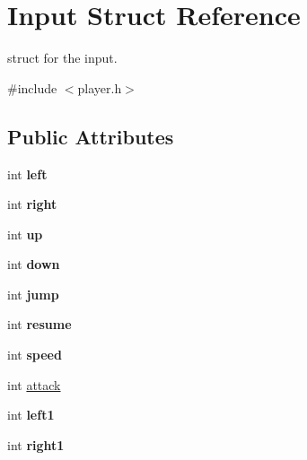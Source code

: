 \hypertarget{structInput}{}\section{Input Struct Reference}
\label{structInput}


struct for the input.  




{\ttfamily \#include $<$player.\+h$>$}

\subsection*{Public Attributes}
\begin{DoxyCompactItemize}
\item 
\mbox{\label{structInput_aa5becba821fbe9c146c332091ebcc6f2}} 
int {\bfseries left}
\item 
\mbox{\label{structInput_a481ae9265fafe80dad6850a24980bfb5}} 
int {\bfseries right}
\item 
\mbox{\label{structInput_ad83fb715e39bdc509caf1c2bb7bf692d}} 
int {\bfseries up}
\item 
\mbox{\label{structInput_a24c4a5d08fb4de9300931efb8e7787fb}} 
int {\bfseries down}
\item 
\mbox{\label{structInput_a02196046bee72669d3fb90a36000d157}} 
int {\bfseries jump}
\item 
\mbox{\label{structInput_a61b1a2fe79b4d572ff5ef60ec78b254e}} 
int {\bfseries resume}
\item 
\mbox{\label{structInput_a9920373d7625cc720024ca0ebb8d3b21}} 
int {\bfseries speed}
\item 
int \hyperlink{structInput_a64f7d1faac36dc0a2e8096b7d3c1e7fc}{attack}
\item 
\mbox{\label{structInput_abedc1fce386fa72e9665c0ea589b78a9}} 
int {\bfseries left1}
\item 
\mbox{\label{structInput_a80713a1c3de41ad2ad8f3a01a61fa01a}} 
int {\bfseries right1}
\item 

\end{DoxyCompactItemize}
